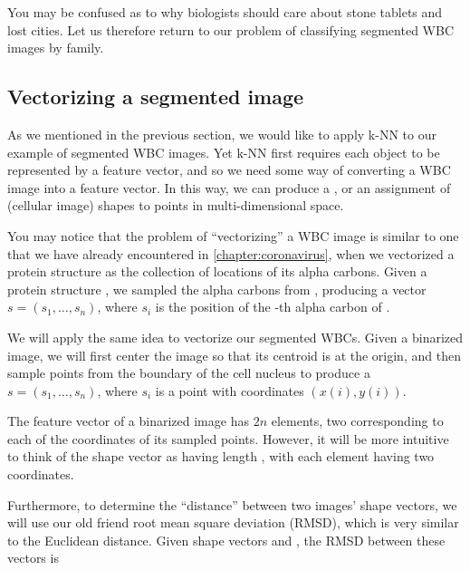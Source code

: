 You may be confused as to why biologists should care about stone tablets and lost cities. Let us therefore return to our problem of classifying segmented WBC images by family.

\FloatBarrier
{}
\subsection{Vectorizing a segmented image}

As we mentioned in the previous section, we would like to apply k-NN to our example of segmented WBC images. Yet k-NN first requires each object to be represented by a feature vector, and so we need some way of converting a WBC image into a feature vector. In this way, we can produce a , or an assignment of (cellular image) shapes to points in multi-dimensional space.

You may notice that the problem of ``vectorizing'' a WBC image is similar to one that we have already encountered in \autoref{chapter:coronavirus}, when we vectorized a protein structure as the collection of locations of its alpha carbons. Given a protein structure , we sampled the  alpha carbons from , producing a vector $s = (s_1, \ldots, s_n)$, where $s_i$ is the position of the -th alpha carbon of .

We will apply the same idea to vectorize our segmented WBCs. Given a binarized image, we will first center the image so that its centroid is at the origin, and then sample  points from the boundary of the cell nucleus to produce a  $s = (s_1, \ldots, s_n)$, where $s_i$ is a point with coordinates $(x(i), y(i))$.

\begin{note}\end{note}

The feature vector of a binarized image has $2n$ elements, two corresponding to each of the coordinates of its  sampled points. However, it will be more intuitive to think of the shape vector as having length , with each element having two coordinates.

Furthermore, to determine the ``distance'' between two images' shape vectors, we will use our old friend root mean square deviation (RMSD), which is very similar to the Euclidean distance. Given shape vectors  and , the RMSD between these vectors is


